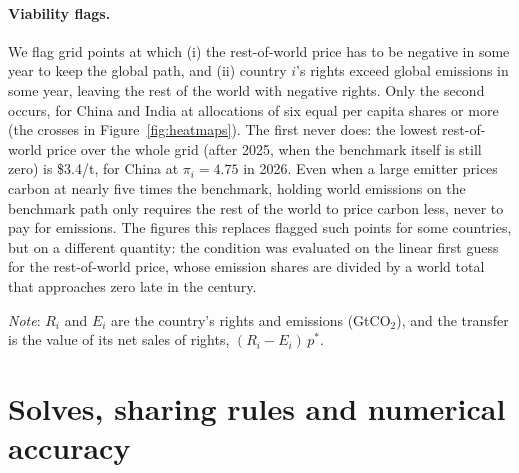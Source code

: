 \documentclass[12pt,english]{article}
\theoremstyle{remark}
\begin{document}
\paragraph{Viability flags.} We flag grid points at which (i) the rest-of-world price has to be negative in some year to keep the global path, and (ii) country $i$'s rights exceed global emissions in some year, leaving the rest of the world with negative rights. Only the second occurs, for China and India at allocations of six equal per capita shares or more (the crosses in Figure~\ref{fig:heatmaps}). The first never does: the lowest rest-of-world price over the whole grid (after 2025, when the benchmark itself is still zero) is \$3.4/t, for China at $\pi_i=4.75$ in 2026. Even when a large emitter prices carbon at nearly five times the benchmark, holding world emissions on the benchmark path only requires the rest of the world to price carbon less, never to pay for emissions. The figures this replaces flagged such points for some countries, but on a different quantity: the condition was evaluated on the linear first guess for the rest-of-world price, whose emission shares are divided by a world total that approaches zero late in the century.

\begin{table}[htbp]
\centering\small
\caption{Autarky scenario for the United States ($\pi_i=2$)}
\label{tab:autarky_usa}
\end{table}

\begin{table}[htbp]
\centering\small
\caption{Uniform-price scenario for the Democratic Republic of Congo ($\rho_i=0.5$)}
\label{tab:uniform_cod}
\begin{minipage}{\textwidth}\footnotesize
\emph{Note}: $R_i$ and $E_i$ are the country's rights and emissions (GtCO$_2$), and the transfer is the value of its net sales of rights, $(R_i-E_i)\,p^*$.
\end{minipage}
\end{table}

\section{Solves, sharing rules and numerical accuracy}
\label{app:variants}
\end{document}
